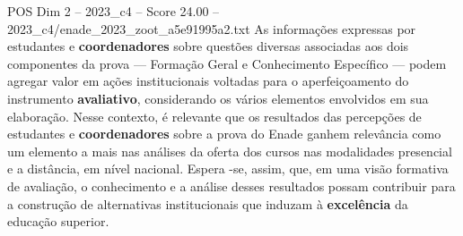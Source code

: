 \begin{textsample}{POS Dim 2 – 2023\_c4 – Score 24.00 – 2023\_c4/enade\_2023\_zoot\_a5e91995a2.txt}
As informações expressas por estudantes e \textbf{coordenadores} sobre questões diversas associadas aos dois componentes da prova — Formação Geral e Conhecimento Específico — podem agregar valor em ações institucionais voltadas para o aperfeiçoamento do instrumento \textbf{avaliativo}, considerando os vários elementos envolvidos em sua elaboração.
Nesse contexto, é relevante que os resultados das percepções de estudantes e \textbf{coordenadores} sobre a prova do Enade ganhem relevância como um elemento a mais nas análises da oferta dos cursos nas modalidades presencial e a distância, em nível nacional.
Espera -se, assim, que, em uma visão formativa de avaliação, o conhecimento e a análise desses resultados possam contribuir para a construção de alternativas institucionais que induzam à \textbf{excelência} da educação superior.

\end{textsample}
